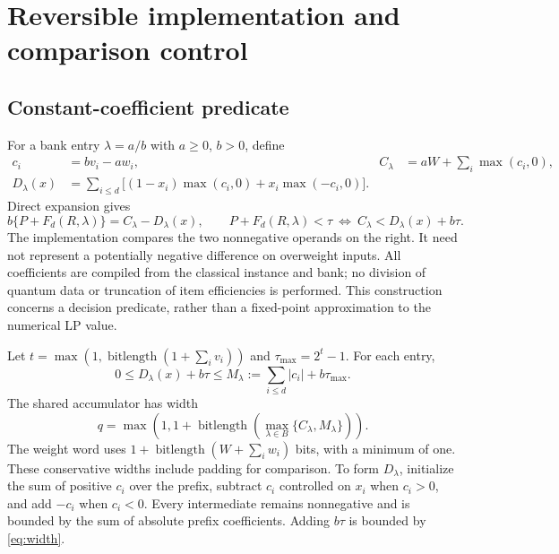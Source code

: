 \documentclass[referee,pdflatex,sn-mathphys-num]{sn-jnl}
\theoremstyle{thmstyleone}
\theoremstyle{thmstyletwo}
\begin{document}
\section{Reversible implementation and comparison control}\label{sec:circuit}
\subsection{Constant-coefficient predicate}
For a bank entry $\lambda=a/b$ with $a\geq0$, $b>0$, define
\begin{align}
 c_i&=bv_i-aw_i,& C_\lambda&=aW+\sum_i\max(c_i,0),\\
 D_\lambda(x)&=\sum_{i\leq d}\bigl[(1-x_i)\max(c_i,0)+x_i\max(-c_i,0)\bigr].\label{eq:loss}
\end{align}
Direct expansion gives
\begin{equation}\label{eq:integercompare}
 b\{P+F_d(R,\lambda)\}=C_\lambda-D_\lambda(x),\qquad
 P+F_d(R,\lambda)<\tau\ \Longleftrightarrow\ C_\lambda<D_\lambda(x)+b\tau.
\end{equation}
The implementation compares the two nonnegative operands on the right. It need not represent a potentially negative difference on overweight inputs. All coefficients are compiled from the classical instance and bank; no division of quantum data or truncation of item efficiencies is performed. This construction concerns a decision predicate, rather than a fixed-point approximation to the numerical LP value.

Let $t=\max(1,\operatorname{bitlength}(1+\sum_i v_i))$ and $\tau_{\max}=2^t-1$. For each entry,
\begin{equation}\label{eq:width}
 0\leq D_\lambda(x)+b\tau\leq M_\lambda:=\sum_{i\leq d}|c_i|+b\tau_{\max}.
\end{equation}
The shared accumulator has width
\begin{equation}
 q=\max\left(1,1+\operatorname{bitlength}\left(\max_{\lambda\in B}\{C_\lambda,M_\lambda\}\right)\right).
\end{equation}
The weight word uses $1+\operatorname{bitlength}(W+\sum_iw_i)$ bits, with a minimum of one. These conservative widths include padding for comparison. To form $D_\lambda$, initialize the sum of positive $c_i$ over the prefix, subtract $c_i$ controlled on $x_i$ when $c_i>0$, and add $-c_i$ when $c_i<0$. Every intermediate remains nonnegative and is bounded by the sum of absolute prefix coefficients. Adding $b\tau$ is bounded by \eqref{eq:width}.
\end{document}
